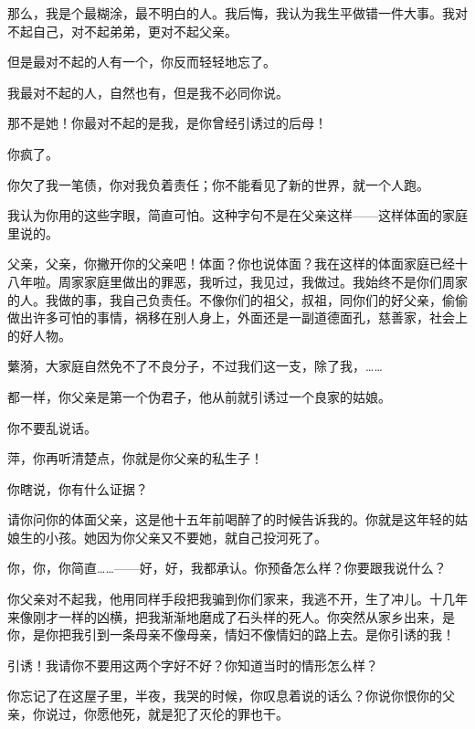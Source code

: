 那么，我是个最糊涂，最不明白的人。我后悔，我认为我生平做错一件大事。我对不起自己，对不起弟弟，更对不起父亲。

但是最对不起的人有一个，你反而轻轻地忘了。

我最对不起的人，自然也有，但是我不必同你说。

那不是她！你最对不起的是我，是你曾经引诱过的后母！

你疯了。

你欠了我一笔债，你对我负着责任；你不能看见了新的世界，就一个人跑。

我认为你用的这些字眼，简直可怕。这种字句不是在父亲这样——这样体面的家庭里说的。

父亲，父亲，你撇开你的父亲吧！体面？你也说体面？我在这样的体面家庭已经十八年啦。周家家庭里做出的罪恶，我听过，我见过，我做过。我始终不是你们周家的人。我做的事，我自己负责任。不像你们的祖父，叔祖，同你们的好父亲，偷偷做出许多可怕的事情，祸移在别人身上，外面还是一副道德面孔，慈善家，社会上的好人物。

蘩漪，大家庭自然免不了不良分子，不过我们这一支，除了我，……

都一样，你父亲是第一个伪君子，他从前就引诱过一个良家的姑娘。

你不要乱说话。

萍，你再听清楚点，你就是你父亲的私生子！

你瞎说，你有什么证据？

请你问你的体面父亲，这是他十五年前喝醉了的时候告诉我的。你就是这年轻的姑娘生的小孩。她因为你父亲又不要她，就自己投河死了。

你，你，你简直……——好，好，我都承认。你预备怎么样？你要跟我说什么？

你父亲对不起我，他用同样手段把我骗到你们家来，我逃不开，生了冲儿。十几年来像刚才一样的凶横，把我渐渐地磨成了石头样的死人。你突然从家乡出来，是你，是你把我引到一条母亲不像母亲，情妇不像情妇的路上去。是你引诱的我！

引诱！我请你不要用这两个字好不好？你知道当时的情形怎么样？

你忘记了在这屋子里，半夜，我哭的时候，你叹息着说的话么？你说你恨你的父亲，你说过，你愿他死，就是犯了灭伦的罪也干。

